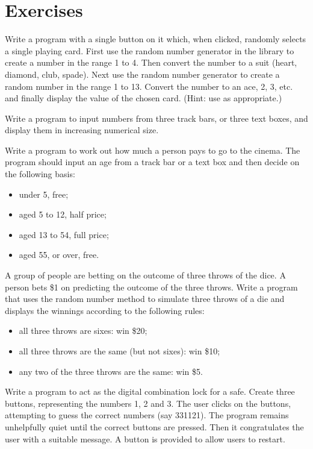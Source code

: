 	\section{Exercises}
		\begin{EXE}
			\item	{} Write a program with a single button on it which, when clicked, randomly selects a single playing card. First use the random number generator in the library to create a number in the range 1 to 4. Then convert the number to a suit (heart, diamond, club, spade). Next use the random number generator to create a random number in the range 1 to 13. Convert the number to an ace, 2, 3, etc. and finally display the value of the chosen card. (Hint: use  as appropriate.)
			\item {} Write a program to input numbers from three track bars, or three text boxes, and display them in increasing numerical size.
			\item {} Write a program to work out how much a person pays to go to the cinema. The program should input an age from a track bar or a text box and then decide on the following basis:
				\begin{itemize}
					\item under 5, free;
					\item aged 5 to 12, half price;
					\item aged 13 to 54, full price;
					\item aged 55, or over, free.
				\end{itemize}
			\item {} A group of people are betting on the outcome of three throws of the dice. A person bets \$1 on predicting the outcome of the three throws. Write a program that uses the random number method to simulate three throws of a die and displays the winnings according to the following rules:
				\begin{itemize}
					\item all three throws are sixes: win \$20;
					\item all three throws are the same (but not sixes): win \$10;
					\item any two of the three throws are the same: win \$5.
				\end{itemize}
			\item	{} Write a program to act as the digital combination lock for a safe. Create three buttons, representing the numbers 1, 2 and 3. The user clicks on the buttons, attempting to guess the correct numbers (say 331121). The program remains unhelpfully quiet until the correct buttons are pressed. Then it congratulates the user with a suitable message. A button is provided to allow users to restart.
			

\end{EXE}
